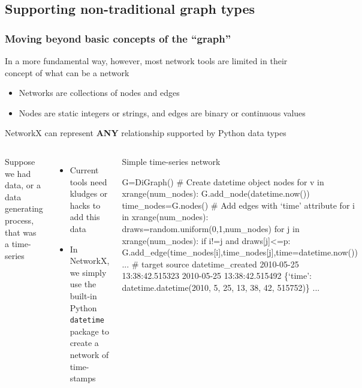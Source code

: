 \documentclass[xcolor=dvipsnames, 9pt]{beamer}
\newenvironment{code}{\begin{semiverbatim} \begin{footnotesize}}
{\end{footnotesize}\end{semiverbatim}}
\begin{document}
\begin{frame}[fragile]
\begin{center}
{\begin{columns}
\begin{center}
            \end{center}
        \end{columns}}
    \end{center}
\end{frame}


\subsection{Supporting non-traditional graph types} %
\label{sub:supporting_non_traditional_graph_types}

\begin{frame}[fragile]
    \frametitle{Moving beyond basic concepts of the ``graph''}
    In a more fundamental way, however, most network tools are limited in their concept of what can be a network
    \begin{itemize}
        \item Networks are collections of nodes and edges
        \item Nodes are static integers or strings, and edges are binary or continuous values
    \end{itemize}
    NetworkX can represent \textbf{ANY} relationship supported by Python data types
    \vspace{2mm}
    \begin{columns}
        \small{Suppose we had data, or a data generating process, that was a time-series
        \begin{itemize}
            \item Current tools need kludges or hacks to add this data
            \item In NetworkX, we simply use the built-in Python \texttt{datetime} package to create a network of time-stamps
        \end{itemize}}
        \begin{block}{\scriptsize{Simple time-series network}}
            \begin{code}
\tiny{G=DiGraph()
\alert<2>{# Create datetime object nodes}
for v in xrange(num_nodes):
    G.add_node(datetime.now())
time_nodes=G.nodes()
\alert<3>{# Add edges with `time' attribute}
for i in xrange(num_nodes):
    draws=random.uniform(0,1,num_nodes)
    for j in xrange(num_nodes):
        if i!=j and draws[j]<=p:
            G.add_edge(time_nodes[i],time_nodes[j],time=datetime.now())
...
\alert<4>{# target source datetime_created}
2010-05-25 13:38:42.515323 2010-05-25 13:38:42.515492 
    \{`time': datetime.datetime(2010, 5, 25, 13, 38, 42, 515752)\}
...}
                \end{code}
            \end{block}
    \end{columns}
\end{frame}
\end{document}
